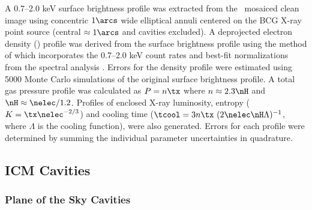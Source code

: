 \documentclass[iop]{emulateapj}
\begin{document}
A 0.7--2.0 keV surface brightness profile was extracted from the
\cxo\ mosaiced clean image using concentric $1\arcs$ wide elliptical
annuli centered on the BCG X-ray point source (central $\approx
1\arcs$ and cavities excluded). A deprojected electron density
(\nelec) profile was derived from the surface brightness profile using
the method of \citet{kriss83} which incorporates the 0.7--2.0 keV
count rates and best-fit normalizations from the spectral analysis
\citep[see][for details]{accept}. Errors for the density profile were
estimated using 5000 Monte Carlo simulations of the original surface
brightness profile. A total gas pressure profile was calculated as $P
= n \tx$ where $n \approx 2.3 \nH$ and $\nH \approx
\nelec/1.2$. Profiles of enclosed X-ray luminosity, entropy ($K = \tx
\nelec^{-2/3}$) and cooling time ($\tcool = 3 n \tx~(2 \nelec \nH
\Lambda)^{-1}$, where $\Lambda$ is the cooling function), were also
generated. Errors for each profile were determined by summing the
individual parameter uncertainties in quadrature.

\subsection{ICM Cavities}
\label{sec:cavities}

\subsubsection{Plane of the Sky Cavities}
\label{sec:ecav}
\end{document}
